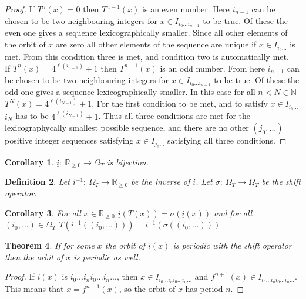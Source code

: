 \documentclass{article}
\newtheorem{theorem}{Theorem}[section]
\newtheorem{cor}[theorem]{Corollary}
\newtheorem{defin}[theorem]{Definition}
\begin{document}
\begin{proof}
If $T^n(x)=0$ then $T^{n-1}(x)$ is an even number. Here $i_{n-1}$ can be chosen to be two neighbouring integers for $x \in I_{i_0...i_{n-1}}$ to be true. Of these the even one gives a sequence lexicographically smaller. Since all other elements of the orbit of $x$ are zero all other elements of the sequence are unique if $x\in I_{i_0...}$ is met. From this condition three is met, and condition two is automatically met.\\

If $T^n(x) = 4^{\ell(i_{n-1})} +1$ then $T^{n-1}(x)$ is an odd number. From here $i_{n-1}$ can be chosen to be two neighbouring integers for $x \in I_{i_0...i_{n-1}}$ to be true. Of these the odd one gives a sequence lexicographically smaller. In this case for all $n < N \in \mathbb{N}$  $T^N(x) = 4^{\ell(i_{N-1})} +1$. For the first condition to be met, and to satisfy $x \in I_{i_0...}$ $i_N$ has to be $4^{\ell(i_{N-1})} +1$. Thus all three conditions are met for the lexicographycally smallest possible sequence, and there are no other $(j_0,...)$ positive integer sequences satisfying $x \in I_{j_0...}$ satisfying all three conditions. 
\end{proof}

\begin{cor}
$\underline{i}:\: \mathbb{R}_{\geq0} \rightarrow \Omega_T$ is bijection.
\end{cor}

\begin{defin}
Let $\underline{i}^{-1}:\:  \Omega_T \rightarrow \mathbb{R}_{\geq0}$ be the inverse of $\underline{i}$. Let $\sigma : \:\Omega_T \rightarrow \Omega_T $ be the shift operator.
\end{defin}

\begin{cor}
For all $x \in \mathbb{R}_{\geq 0}$ $\underline{i}(T(x)) = \sigma(\underline{i}(x))$ and for all $(i_0,...) \in \Omega_T$ $T(\underline{i}^{-1}((i_0,...)))=\underline{i}^{-1}(\sigma((i_0,...)))$
\end{cor}

\begin{theorem}
If for some $x$ the orbit of $\underline{i}(x)$ is periodic with the shift operator then the orbit of $x$ is periodic as well.
\end{theorem}

\begin{proof}
If $\underline{i}(x)$ is $i_0...i_ni_0...i_n...$, then $x \in I_{i_0...i_ni_0...i_n...}$ and $f^{n+1}(x) \in I_{i_0...i_ni_0...i_n...}$. This means that $x = f^{n+1}(x)$, so the orbit of $x$ has period $n$.
\end{proof}
\end{document}
